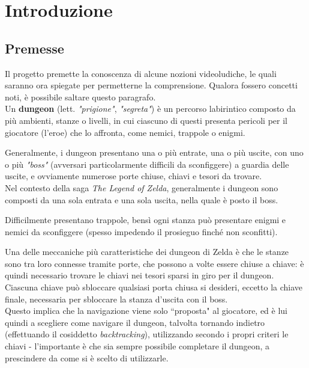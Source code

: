 \documentclass[12pt,titlepage]{article}
\begin{document}
\newpage
\tableofcontents
\newpage

\section{Introduzione}

\subsection {Premesse}
Il progetto premette la conoscenza di alcune nozioni videoludiche, le quali saranno ora spiegate per permetterne la comprensione. Qualora fossero concetti noti, è possibile saltare questo paragrafo.\\


\noindent Un \textbf{dungeon} (lett. \textit{"prigione"}, \textit{"segreta"}) è un percorso labirintico composto da più ambienti, stanze o livelli, in cui ciascuno di questi presenta pericoli per il giocatore (l'eroe) che lo affronta, come nemici, trappole o enigmi.

Generalmente, i dungeon presentano una o più entrate, una o più uscite, con uno o più \textit{"boss"} (avversari particolarmente difficili da sconfiggere) a guardia delle uscite, e ovviamente numerose porte chiuse, chiavi e tesori da trovare.\\


\noindent Nel contesto della saga \textit{The Legend of Zelda}, generalmente i dungeon sono composti da una sola entrata e una sola uscita, nella quale è posto il boss.

Difficilmente presentano trappole, bensì ogni stanza può presentare enigmi e nemici da sconfiggere (spesso impedendo il prosieguo finché non sconfitti).

Una delle meccaniche più caratteristiche dei dungeon di Zelda è che le stanze sono tra loro connesse tramite porte, che possono a volte essere chiuse a chiave: è quindi necessario trovare le chiavi nei tesori sparsi in giro per il dungeon. Ciascuna chiave può sbloccare qualsiasi porta chiusa si desideri, eccetto la chiave finale, necessaria per sbloccare la stanza d'uscita con il boss.\\

\noindent Questo implica che la navigazione viene solo ``proposta" al giocatore, ed è lui quindi a scegliere come navigare il dungeon, talvolta tornando indietro (effettuando il cosiddetto \textit{backtracking}), utilizzando secondo i propri criteri le chiavi - l'importante è che sia sempre possibile completare il dungeon, a prescindere da come si è scelto di utilizzarle.
\end{document}
